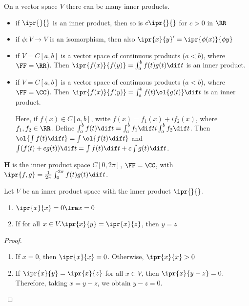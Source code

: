 \documentclass[11pt]{scrartcl}
\begin{document}
\begin{remark}
On a vector space $V$ there can be many inner products.
\end{remark}
\begin{example}

\begin{itemize}
\item if $\ipr{\*}{\*}$ is an inner product, then so is $c\ipr{\*}{\*}$ for $c>0$ in $\RR$
\item if $\phi:V\to V$ is an isomorphism, then also $\ipr{x}{y}'=\ipr{\phi(x)}{\phi{y}}$
\item if $V = C[a,b]$ is a vector space of continuous products
  ($a<b$), where $\FF = \RR$). Then $\ipr{f(x)}{f(y)} = \int_a^bf(t)g(t)\dif t$ is an inner product.
\item if $V = C[a,b]$ is a vector space of continuous products
  ($a<b$), where $\FF = \CC$). Then
  $\ipr{f(x)}{f(y)} = \int_a^bf(t)\ol{g(t)}\dif t$ is an inner
  product.

  Here, if $f(x) \in C[a,b]$, write $f(x) = f_1(x) + i f_2(x)$, where
  $f_1, f_2\in \RR$. Define
  $\int_a^bf(t)\dif t = \int_a^bf_1 \dif t i \int_a^bf_2 \dif t$. Then
  $\ol{\int f(t) \dif t} = \int \ol{f(t) \dif t }$ and
  $\int(f(t)+cg(t))\dif t = \int f(t)\dif t + c \int g(t) \dif t$.
\end{itemize}
\end{example}

\begin{definition}
  \hfill
  \textbf{H} is the inner product space $C[0,2\pi]$, $\FF = \CC$, with
  $\ipr{f, g} = \frac{1}{2\pi}\int_0^{2\pi}f(t)g(t)\dif t$.
\end{definition}

\begin{theorem}
  Let $V$ be an inner product space with the inner product $\ipr{\*}{\*}$.

  \begin{enumerate}[label=\alph*)]
  \item $\ipr{x}{x} = 0 \lra x = 0$
  \item If for all $x\in V.\ipr{x}{y} = \ipr{x}{z}$, then $y = z$
  \end{enumerate}

\end{theorem}
\begin{proof}
  \begin{enumerate}[label=\alph*)]
  \item If $x = 0$, then $\ipr{x}{x} = 0$. Otherwise, $\ipr{x}{x}>0$
  \item If $\ipr{x}{y} = \ipr{x}{z}$ for all $x\in V$, then
    $\ipr{x}{y-z} = 0$. Therefore, taking $x = y-z$, we obtain $y - z =0$.
  \end{enumerate}
\end{proof}
\end{document}
